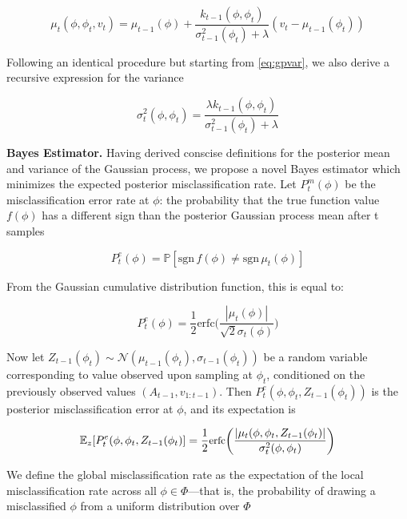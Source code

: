\documentclass[letterpaper, 10 pt, conference]{ieeeconf}  %
\begin{document}
\begin{equation}
    \mu_t(\phi,\phi_t,v_t) = \mu_{t-1}(\phi) + \frac{k_{t-1}(\phi,\phi_t)}{\sigma_{t-1}^2(\phi_t)+\lambda}(v_t-\mu_{t-1}(\phi_t))
    \label{eq:recmu}
\end{equation}

Following an identical procedure but starting from \eqref{eq:gpvar}, we also derive a recursive expression for the variance

\begin{equation}
    \sigma_t^2(\phi,\phi_t) = \frac{\lambda k_{t-1}(\phi,\phi_t)}{\sigma_{t-1}^2(\phi_t)+\lambda}
    \label{eq:recsig}
\end{equation}
\smallskip

\noindent\textbf{Bayes Estimator.} Having derived conscise definitions for the posterior mean and variance of the Gaussian process, we propose a novel Bayes estimator which minimizes the expected posterior misclassification rate. Let $P^m_t(\phi)$ be the misclassification error rate at $\phi$: the probability that the true function value $f(\phi)$ has a different sign than the posterior Gaussian process mean after t samples


\begin{equation}
    P^e_t (\phi) = \mathbb{P}[\text{sgn}\,f(\phi)\neq \text{sgn}\,\mu_t(\phi)]
\end{equation}

From the Gaussian cumulative distribution function, this is equal to:

\begin{equation}
    P^e_t(\phi) = \frac{1}{2}\text{erfc}\bigg(\frac{|\mu_t(\phi)|}{\sqrt{2}\sigma_t(\phi)}\bigg)
\end{equation}
\smallskip

Now let $Z_{t-1}(\phi_t)\sim\mathcal{N}(\mu_{t-1}(\phi_t),\sigma_{t-1}(\phi_t))$ be a random variable corresponding to value observed upon sampling at $\phi_t$, conditioned on the previously observed values $(A_{t-1},v_{1:t-1})$. Then $P_t^e(\phi,\phi_t,Z_{t-1}(\phi_t))$ is the posterior misclassification error at $\phi$, and its expectation is

\begin{equation}
    \small
    \mathbb{E}_{z}[P_t^e(\phi,\phi_t,Z_{t-1}(\phi_t)] = \frac{1}{2}\text{erfc}\bigg(\frac{|\mu_t(\phi,\phi_t,Z_{t-1}(\phi_t)|}{\sigma_t^2(\phi,\phi_t)}\bigg)
    \label{eq:exprec}
\end{equation}
\smallskip

We define the global misclassification rate as the expectation of the local misclassification rate across all $\phi\in\Phi$---that is, the probability of drawing a misclassified $\phi$ from a uniform distribution over $\Phi$
\end{document}
